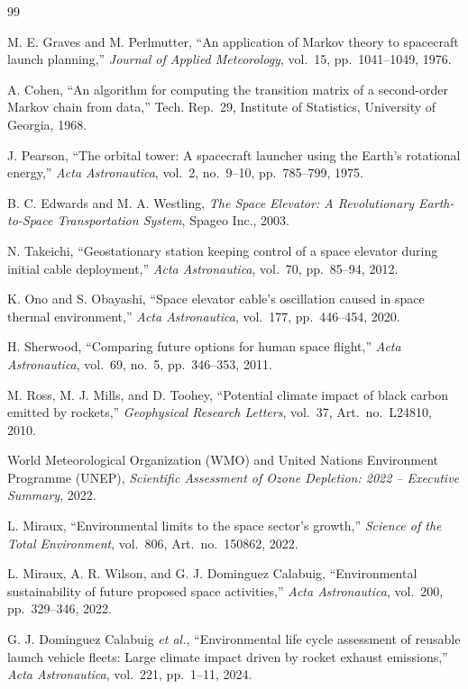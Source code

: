\documentclass[12pt]{article}
\begin{document}
\begin{thebibliography}{99}

M. E. Graves and M. Perlmutter,
``An application of Markov theory to spacecraft launch planning,''
\emph{Journal of Applied Meteorology},
vol.~15, pp.~1041--1049, 1976.

A. Cohen,
``An algorithm for computing the transition matrix of a second-order Markov chain from data,''
Tech. Rep.~29,
Institute of Statistics, University of Georgia, 1968.

J. Pearson,
``The orbital tower: A spacecraft launcher using the Earth's rotational energy,''
\emph{Acta Astronautica},
vol.~2, no.~9--10, pp.~785--799, 1975.

B. C. Edwards and M. A. Westling,
\emph{The Space Elevator: A Revolutionary Earth-to-Space Transportation System},
Spageo Inc., 2003.

N. Takeichi,
``Geostationary station keeping control of a space elevator during initial cable deployment,''
\emph{Acta Astronautica},
vol.~70, pp.~85--94, 2012.

K. Ono and S. Obayashi,
``Space elevator cable's oscillation caused in space thermal environment,''
\emph{Acta Astronautica},
vol.~177, pp.~446--454, 2020.

H. Sherwood,
``Comparing future options for human space flight,''
\emph{Acta Astronautica},
vol.~69, no.~5, pp.~346--353, 2011.

M. Ross, M. J. Mills, and D. Toohey,
``Potential climate impact of black carbon emitted by rockets,''
\emph{Geophysical Research Letters},
vol.~37, Art.~no.~L24810, 2010.

World Meteorological Organization (WMO) and United Nations Environment Programme (UNEP),
\emph{Scientific Assessment of Ozone Depletion: 2022 -- Executive Summary},
2022.

L. Miraux,
``Environmental limits to the space sector's growth,''
\emph{Science of the Total Environment},
vol.~806, Art.~no.~150862, 2022.

L. Miraux, A. R. Wilson, and G. J. Dominguez Calabuig,
``Environmental sustainability of future proposed space activities,''
\emph{Acta Astronautica},
vol.~200, pp.~329--346, 2022.

G. J. Dominguez Calabuig \emph{et al.},
``Environmental life cycle assessment of reusable launch vehicle fleets: Large climate impact driven by rocket exhaust emissions,''
\emph{Acta Astronautica},
vol.~221, pp.~1--11, 2024.


\end{thebibliography}




\end{document}
